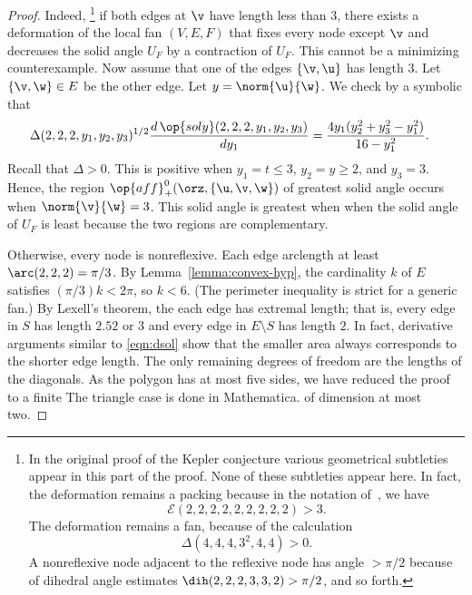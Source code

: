 \begin{proof}
  Indeed,%
\footnote{In the original proof of the Kepler conjecture 
  various geometrical subtleties appear in this part of the
  proof.  None of these subtleties appear here.  In fact, the
  deformation remains a packing because in the notation of~\cite{Hales:2006:DCG},
 we have
\[
{\mathcal E}(2,2,2,2,2,2,2,2,2)> 3.
\]
The deformation remains a fan, because of the calculation
\[
\Delta(4,4,4,3^2,4,4)>0.
\]
A nonreflexive node adjacent to the reflexive node has angle $>\pi/2$
because of dihedral angle estimates $\dih(2,2,2,3,3,2)>\pi/2$, and
so forth.  } 
if both edges at $\v$ have length less than $3$, there
exists a deformation of the local fan $(V,E,F)$ that fixes every node
except $\v$ and decreases the solid angle $U_F$ by a contraction of $U_F$.  
This cannot be a
minimizing counterexample.  Now assume that one of the edges
$\{\v,\u\}$ has length $3$.  Let $\{\v,\w\}\in E$ be the other edge.
Let
$y=\norm{\u}{\w}$.  We check by a symbolic
 that
\begin{align}\label{eqn:dsol}
\Delta(2,2,2,y_1,y_2,y_3)^{1/2}\dfrac{d\,\op{soly}(2,2,2,y_1,y_2,y_3)}{dy_1} &= 
\dfrac{4 y_1 (y_2^2 + y_3^2- y_1^2)}{16- y_1^2}.
\end{align}
 Recall that $\Delta>0$.
This is positive
when $y_1=t\le3$, $y_2=y\ge 2$, and $y_3=3$. 
Hence, the region
$\op{aff}^0_+(\orz,\{\u,\v,\w\})$ of greatest
solid angle occurs when $\norm{\v}{\w}=3$.  This solid angle is greatest when
when the solid angle of $U_F$ is least because  the two regions are complementary.


  Otherwise,
every node is nonreflexive.  Each edge arclength at least
$\arc(2,2,2)=\pi/3$.  By Lemma~\ref{lemma:convex-hyp}, the cardinality
$k$ of $E$ satisfies $(\pi/3)k < 2\pi$, so $k<6$.  (The perimeter inequality is
strict for a generic fan.)  By Lexell's theorem, the each edge has
extremal length;  that is, every edge in $S$ has length $2.52$ or
$3$ and every edge in $E\setminus S$ has length $2$.  In fact, derivative
arguments similar to \eqref{eqn:dsol} show that the smaller area always
corresponds to the shorter edge length.  The only
remaining degrees of freedom are the lengths of the diagonals.  As the
polygon has at most five sides, we have reduced the proof  to a
finite  %
{The triangle case is done in Mathematica.} of dimension at
most two.


\end{proof}
